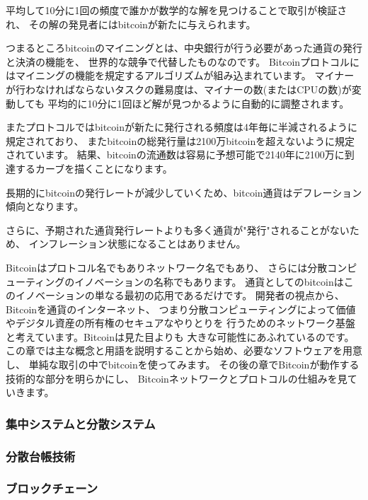 \documentclass[a4paper,12pt]{jsarticle}
\begin{document}
平均して10分に1回の頻度で誰かが数学的な解を見つけることで取引が検証され、
その解の発見者にはbitcoinが新たに与えられます。

つまるところbitcoinのマイニングとは、中央銀行が行う必要があった通貨の発行と決済の機能を、
世界的な競争で代替したものなのです。
Bitcoinプロトコルにはマイニングの機能を規定するアルゴリズムが組み込まれています。
マイナーが行わなければならないタスクの難易度は、マイナーの数(またはCPUの数)が変動しても
平均的に10分に1回ほど解が見つかるように自動的に調整されます。 

またプロトコルではbitcoinが新たに発行される頻度は4年毎に半減されるように規定されており、
またbitcoinの総発行量は2100万bitcoinを超えないように規定されています。
結果、bitcoinの流通数は容易に予想可能で2140年に2100万に到達するカーブを描くことになります。

長期的にbitcoinの発行レートが減少していくため、bitcoin通貨はデフレーション傾向となります。

さらに、予期された通貨発行レートよりも多く通貨が"発行"されることがないため、
インフレーション状態になることはありません。

Bitcoinはプロトコル名でもありネットワーク名でもあり、
さらには分散コンピューティングのイノベーションの名称でもあります。
通貨としてのbitcoinはこのイノベーションの単なる最初の応用であるだけです。
開発者の視点から、Bitcoinを通貨のインターネット、
つまり分散コンピューティングによって価値やデジタル資産の所有権のセキュアなやりとりを
行うためのネットワーク基盤と考えています。Bitcoinは見た目よりも
大きな可能性にあふれているのです。
この章では主な概念と用語を説明することから始め、必要なソフトウェアを用意し、
単純な取引の中でbitcoinを使ってみます。
その後の章でBitcoinが動作する技術的な部分を明らかにし、
Bitcoinネットワークとプロトコルの仕組みを見ていきます。

\subsubsection{集中システムと分散システム}



\subsubsection{分散台帳技術}


\subsubsection{ブロックチェーン}
\end{document}
